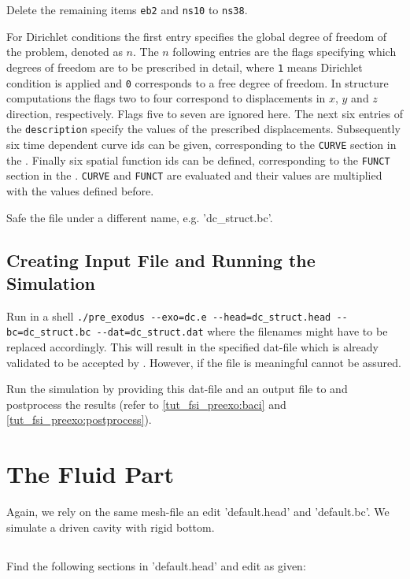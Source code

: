 Delete the remaining items \verb|eb2| and \verb|ns10| to \verb|ns38|. \newline

For Dirichlet conditions the first entry specifies the global degree of freedom of the problem, denoted as $n$. The $n$ following entries are the flags specifying which degrees of freedom are to be prescribed in detail, where \verb|1| means Dirichlet condition is applied and \verb|0| corresponds to a free degree of freedom. In structure computations the flags two to four correspond to displacements in $x$, $y$ and $z$ direction, respectively. Flags five to seven are ignored here. The next six entries of the \verb|description| specify the values of the prescribed displacements. Subsequently six time dependent curve ids can be given, corresponding to the \verb|CURVE| section in the \head. Finally six spatial function ids can be defined, corresponding to the \verb|FUNCT| section in the \head. \verb|CURVE| and \verb|FUNCT| are evaluated and their values are multiplied with the values defined before. \newline

Safe the file under a different name, e.g. 'dc\_struct.bc'.

\subsection{Creating \baci{} Input File and Running the Simulation}
Run in a shell \verb|./pre_exodus --exo=dc.e --head=dc_struct.head --bc=dc_struct.bc --dat=dc_struct.dat| where the filenames might have to be replaced accordingly. This will result in the specified dat-file which is already validated to be accepted by \baci{}. However, if the file is meaningful cannot be assured.

Run the simulation by providing this dat-file and an output file to \baci{} and postprocess the results (refer to \ref{tut_fsi_preexo:baci} and \ref{tut_fsi_preexo:postprocess}).

\section{The Fluid Part}
Again, we rely on the same mesh-file an edit 'default.head' and 'default.bc'. We simulate a driven cavity with rigid bottom.

\subsection{\head}
Find the following sections in 'default.head' and edit as given:

